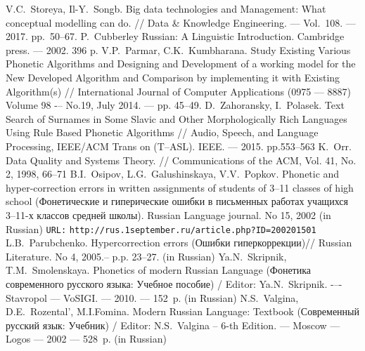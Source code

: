 \documentclass[conference,a4paper]{IEEEtran}
\providecommand\url[1]{\texttt{#1}}
\begin{document}
%
%
%
\begin{thebibliography}{11}

 V.C.~Storeya, Il-Y.~Songb. Big data technologies and Management: What conceptual modelling can do. // Data \& Knowledge Engineering. --- Vol.~108. --- 2017. pp.~50--67.
 P.~Cubberley Russian: A Linguistic Introduction. Cambridge press. --– 2002. 396 p.
	V.P.~Parmar, C.K.~Kumbharana. Study Existing Various Phonetic Algorithms and Designing and Development of a working model for the New Developed Algorithm and Comparison by implementing it with Existing Algorithm(s) // International Journal of Computer Applications (0975 –-- 8887) Volume 98 -– No.19, July 2014. --– pp. 45--49.
 D.~Zahoransky, I.~Polasek. Text Search of Surnames in Some Slavic and Other Morphologically Rich Languages Using Rule Based Phonetic Algorithms // Audio, Speech, and Language Processing, IEEE/ACM Trans on (T--ASL). IEEE. --– 2015. pp.553--563
 K.~Orr. Data Quality and Systems Theory. // Communications of the ACM, Vol. 41, No. 2, 1998, 66--71
	B.I.~Osipov, L.G.~Galushinskaya, V.V.~Popkov. Phonetic and hyper-correction errors in written assignments of students of 3--11 classes of high school (Фонетические и гиперические ошибки в письменных работах учащихся 3–11-х классов средней школы). Russian Language journal. No 15, 2002 (in Russian) \texttt{URL:} \url{http://rus.1september.ru/article.php?ID=200201501}
 L.B.~Parubchenko. Hypercorrection errors (Ошибки гиперкоррекции)// Russian Literature. No 4, 2005.-- p.p. 23--27. (in Russian)
 Ya.N.~Skripnik, T.M.~Smolenskaya. Phonetics of modern Russian Language (Фонетика современного русского языка: Учебное пособие) / Editor: Ya.N.~Skripnik. -–- Stavropol --- VoSIGI. --- 2010. --– 152~p. (in Russian)
 N.S.~Valgina, D.E.~Rozental', M.I.Fomina. Modern Russian Language: Textbook (Современный русский язык: Учебник) / Editor: N.S.~Valgina -- 6-th Edition. --- Moscow --- Logos --- 2002 --– 528~p. (in Russian)

\end{thebibliography}
\end{document}
